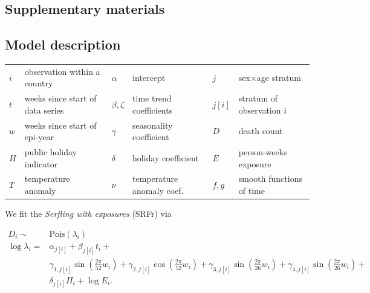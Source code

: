 \documentclass[12pt]{article}
\begin{document}


\clearpage


\renewcommand\thefigure{S.\arabic{figure}}
\setcounter{figure}{0}

\begin{appendix}

\section*{Supplementary materials}

\subsection*{Model description}

\begin{tabular}{llllll}
$i$ & observation within a country & $\alpha$ & intercept & $j$ & sex$\times$age stratum \\
$t$ & weeks since start of data series & $\beta, \zeta$ & time trend coefficients & $j[i]$ & stratum of observation $i$ \\
$w$ & weeks since start of epi-year & $\gamma$ & seasonality coefficient & $D$ & death count \\
$H$ & public holiday indicator & $\delta$ & holiday coefficient & $E$ & person-weeks exposure \\
$T$ & temperature anomaly & $\nu$ & temperature anomaly coef. & $f,g$ & smooth functions of time
\end{tabular}

\vspace{1em}

We fit the \emph{Serfling with exposures} (SRFr) via

\begin{equation}
\begin{aligned}
  D_i \sim& \text{Pois}(\lambda_i) \\
  \log \lambda_i =& \alpha_{j[i]} + \beta_{j[i]}t_i + \\
& \gamma_{1,j[i]}\sin\left(\frac{2\pi}{52}w_i\right) +
  \gamma_{2,j[i]}\cos\left(\frac{2\pi}{52}w_i\right) +
  \gamma_{3,j[i]}\sin\left(\frac{2\pi}{26}w_i\right) +
  \gamma_{4,j[i]}\sin\left(\frac{2\pi}{26}w_i\right) + \\
 & \delta_{j[i]}H_i + \log E_i.
\end{aligned}
\label{eq:srfr}
\end{equation}


\end{appendix}
\end{document}

